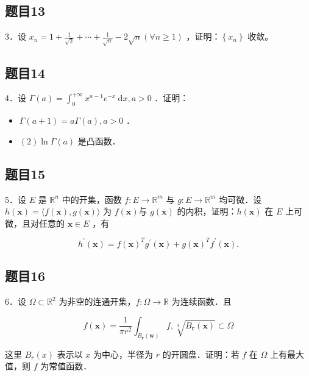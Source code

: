 \documentclass{article}
\begin{document}
\subsection{题目13}
3．设 \(x_{n}=1+\frac{1}{\sqrt{2}}+\cdots+\frac{1}{\sqrt{n}}-2 \sqrt{n}(\forall n \geq 1)\) ，证明：\(\left\{x_{n}\right\}\) 收敛。

\subsection{题目14}
4．设 \(\Gamma(a)=\int_{0}^{+\infty} x^{a-1} e^{-x} \mathrm{~d} x, a>0\) ．证明：

\begin{itemize}
  \item[（1）] \(\Gamma(a+1)=a \Gamma(a), a>0\) ．
  \item[] \((2) \ln \Gamma(a)\) 是凸函数．
\end{itemize}

\subsection{题目15}
5．设 \(E\) 是 \(\mathbb{R}^{n}\) 中的开集，函数 \(f: E \rightarrow \mathbb{R}^{m}\) 与 \(g: E \rightarrow \mathbb{R}^{m}\) 均可微．设 \(h(\mathbf{x})=\langle f(\mathbf{x}), g(\mathbf{x})\rangle\) 为 \(f(\mathbf{x})\)与 \(g(\mathbf{x})\) 的内积，证明：\(h(\mathbf{x})\) 在 \(E\) 上可微，且对任意的 \(\mathbf{x} \in E\) ，有

\[
h^{\prime}(\mathbf{x})=f(\mathbf{x})^{T} g^{\prime}(\mathbf{x})+g(\mathbf{x})^{T} f^{\prime}(\mathbf{x}) .
\]

\subsection{题目16}
6．设 \(\Omega \subset \mathbb{R}^{2}\) 为非空的连通开集，\(f: \Omega \rightarrow \mathbb{R}\) 为连续函数．且

\[
f(\mathbf{x})=\frac{1}{\pi r^{2}} \int_{B_{\mathbf{r}}(\mathbf{w})} f, \sqrt[4]{B_{\mathbf{r}}(\mathbf{x})} \subset \Omega
\]

这里 \(B_{r}(x)\) 表示以 \(x\) 为中心，半径为 \(r\) 的开圆盘．证明：若 \(f\) 在 \(\Omega\) 上有最大值，则 \(f\) 为常值函数．
\end{document}
